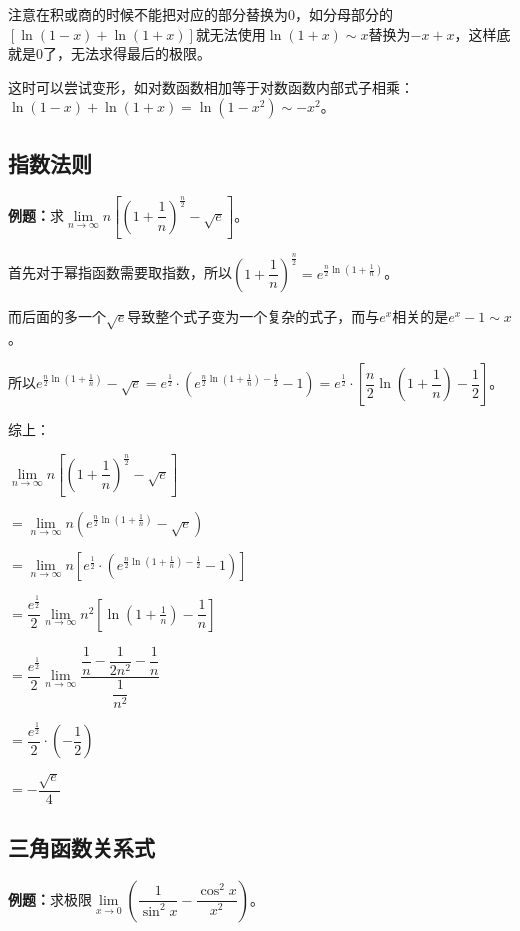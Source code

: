 \documentclass[UTF8, 12pt]{ctexart}
\begin{document}
注意在积或商的时候不能把对应的部分替换为0，如分母部分的$[\ln(1-x)+\ln(1+x)]$就无法使用$\ln(1+x)\sim x$替换为$-x+x$，这样底就是0了，无法求得最后的极限。

这时可以尝试变形，如对数函数相加等于对数函数内部式子相乘：$\ln(1-x)+\ln(1+x)=\ln(1-x^2)\sim-x^2$。

\subsection{指数法则}

\textbf{例题：}求$\lim\limits_{n\to\infty}n\left[\left(1+\dfrac{1}{n}\right)^{\frac{n}{2}}-\sqrt{e}\right]$。

首先对于幂指函数需要取指数，所以$\left(1+\dfrac{1}{n}\right)^{\frac{n}{2}}=e^{\frac{n}{2}\ln(1+\frac{1}{n})}$。\medskip

而后面的多一个$\sqrt{e}$导致整个式子变为一个复杂的式子，而与$e^x$相关的是$e^x-1\sim x$。

所以$e^{\frac{n}{2}\ln(1+\frac{1}{n})}-\sqrt{e}=e^{\frac{1}{2}}\cdot\left(e^{\frac{n}{2}\ln(1+\frac{1}{n})-\frac{1}{2}}-1\right)=e^{\frac{1}{2}}\cdot\left[\dfrac{n}{2}\ln(1+\dfrac{1}{n})-\dfrac{1}{2}\right]$。

综上：

$\lim\limits_{n\to\infty}n\left[\left(1+\dfrac{1}{n}\right)^{\frac{n}{2}}-\sqrt{e}\right]$ \medskip

$=\lim\limits_{n\to\infty}n\left(e^{\frac{n}{2}\ln(1+\frac{1}{n})}-\sqrt{e}\right)$ \medskip

$=\lim\limits_{n\to\infty}n\left[e^{\frac{1}{2}}\cdot\left(e^{\frac{n}{2}\ln(1+\frac{1}{n})-\frac{1}{2}}-1\right)\right]$ \medskip

$=\dfrac{e^{\frac{1}{2}}}{2}\lim\limits_{n\to\infty}n^2\left[\ln\left(1+\frac{1}{n}\right)-\dfrac{1}{n}\right]$

$=\dfrac{e^{\frac{1}{2}}}{2}\lim\limits_{n\to\infty}\dfrac{\dfrac{1}{n}-\dfrac{1}{2n^2}-\dfrac{1}{n}}{\dfrac{1}{n^2}}$

$=\dfrac{e^{\frac{1}{2}}}{2}\cdot\left(-\dfrac{1}{2}\right)$

$=-\dfrac{\sqrt{e}}{4}$

\subsection{三角函数关系式}

\textbf{例题：}求极限$\lim\limits_{x\to 0}\left(\dfrac{1}{\sin^2x}-\dfrac{\cos^2x}{x^2}\right)$。\medskip
\end{document}
